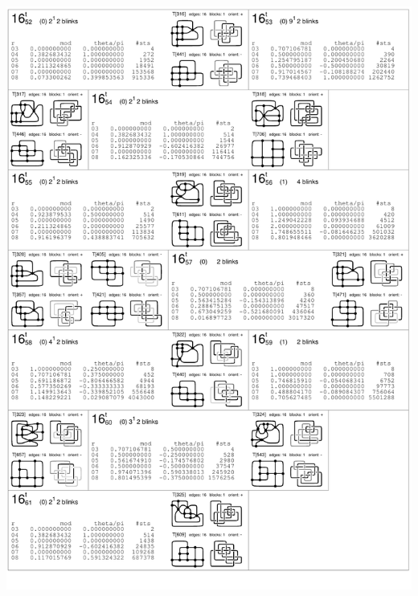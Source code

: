 \begin{center}
 \includegraphics[height=23.5cm]{E.figsbw2/con3catalog020_bw.pdf} \eject 

\end{center}
